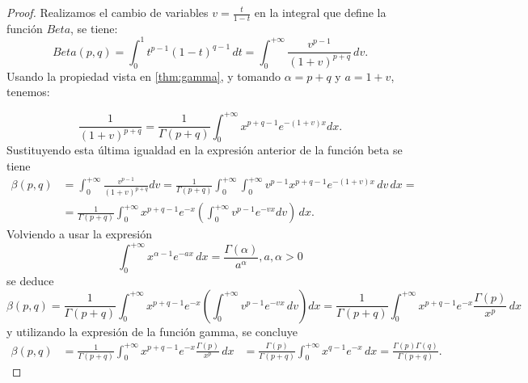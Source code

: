 \begin{proof}
    Realizamos el cambio de variables $v = \frac{t}{1-t}$ en la integral
    que define la función $Beta$, se tiene:
    \[
        Beta(p,q)=\int_{0}^{1}t^{p-1}(1-t)^{q-1}\,dt=
        \int_{0}^{+\infty}\frac{v^{p-1}}{(1+v)^{p+q}}\,dv.
    \]
    Usando la propiedad vista en \ref{thm:gamma}, y tomando
    $\alpha = p + q$ y $a = 1 + v$, tenemos:

    \[
        \frac{1}{(1+v)^{p+q}}=\frac{1}{\Gamma(p+q)} \int_0^{+\infty} x^{p+q-1} e^{-(1+v) x} d x .
    \]
    Sustituyendo esta última igualdad en la expresión anterior
    de la función beta se tiene
    \begin{align*}
        \beta(p, q) & =\int_0^{+\infty} \frac{v^{p-1}}{(1+v)^{p+q}}
        dv=\frac{1}{\Gamma(p+q)} \int_0^{+\infty} \int_0^{+\infty}
        v^{p-1} x^{p+q-1} e^{-(1+v) x}\,dv\,dx= \\
        & =\frac{1}{\Gamma(p+q)} \int_0^{+\infty} x^{p+q-1}
        e^{-x}\left(\int_0^{+\infty} v^{p-1} e^{-v x} dv\right)\,dx.
    \end{align*}
    Volviendo a usar la expresión
    \[
        \int_0^{+\infty} x^{\alpha-1} e^{-a x}\,dx=
        \frac{\Gamma(\alpha)}{a^\alpha}, a, \alpha>0
    \]
    se deduce
    \[
        \beta(p, q)=\frac{1}{\Gamma(p+q)} \int_0^{+\infty}
        x^{p+q-1} e^{-x}\left(\int_0^{+\infty} v^{p-1}
        e^{-v x}\,dv\right) d x=\frac{1}{\Gamma(p+q)}
        \int_0^{+\infty} x^{p+q-1} e^{-x} \frac{\Gamma(p)}{x^p}\,dx
    \]
    y utilizando la expresión de la función gamma, se concluye
    \begin{align*}
        \beta(p, q)&=\frac{1}{\Gamma(p+q)} \int_0^{+\infty} x^{p+q-1}
        e^{-x} \frac{\Gamma(p)}{x^p}\,dx
        &=\frac{\Gamma(p)}{\Gamma(p+q)} \int_0^{+\infty} x^{q-1}
        e^{-x}\,dx=\frac{\Gamma(p) \Gamma(q)} {\Gamma(p+q)}.
    \end{align*}
    
\end{proof}
